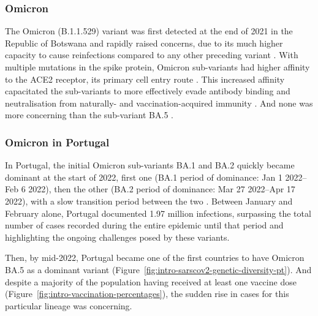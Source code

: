 \subsubsection{Omicron}

The Omicron (B.1.1.529) variant was first detected at the end of 2021 in the Republic of Botswana and rapidly raised concerns, due to its much higher capacity to cause reinfections compared to any other preceding variant \citep{pulliam2022IncreasedRisk}.
With multiple mutations in the spike protein, Omicron sub-variants had higher affinity to the ACE2 receptor, its primary cell entry route \citep{starr2020DeepMutational}.
This increased affinity capacitated the sub-variants to more effectively evade antibody binding and neutralisation from naturally- and vaccination-acquired immunity \citep{arora2022AugmentedNeutralisation, greaney2021CompleteMapping}.
And none was more concerning than the sub-variant BA.5 \citep{cao2022BA12}.


\subsubsection{Omicron in Portugal}

In Portugal, the initial Omicron sub-variants BA.1 and BA.2 quickly became dominant at the start of 2022, first one (BA.1 period of dominance: Jan 1 2022--Feb 6 2022), then the other (BA.2 period of dominance: Mar 27 2022--Apr 17 2022), with a slow transition period between the two \citep{malatoRiskBAInfection2022}.
Between January and February alone, Portugal documented 1.97 million infections, surpassing the total number of cases recorded during the entire epidemic until that period and highlighting the ongoing challenges posed by these variants.

Then, by mid-2022, Portugal became one of the first countries to have Omicron BA.5 as a dominant variant (Figure~\ref{fig:intro-sarscov2-genetic-diversity-pt}).
And despite a majority of the population having received at least one vaccine dose (Figure~\ref{fig:intro-vaccination-percentages}), the sudden rise in cases for this particular lineage was concerning.

